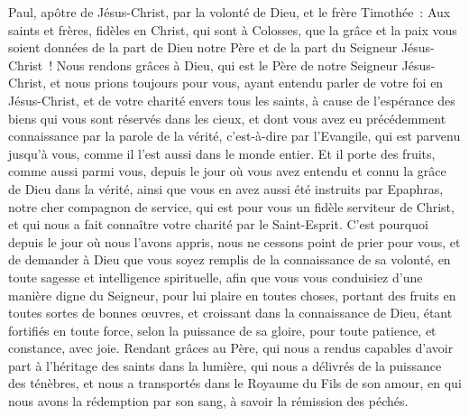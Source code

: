 \begin{multicols}{2}
\VerseOne{}Paul, apôtre de Jésus-Christ, par la volonté de Dieu, et le frère Timothée~:
Aux saints et frères, fidèles en Christ, qui sont à Colosses, que la grâce et la paix vous soient données de la part de Dieu notre Père et de la part du Seigneur Jésus-Christ~!
Nous rendons grâces à Dieu, qui est le Père de notre Seigneur Jésus-Christ, et nous prions toujours pour vous,
ayant entendu parler de votre foi en Jésus-Christ, et de votre charité envers tous les saints,
à cause de l'espérance des biens qui vous sont réservés dans les cieux, et dont vous avez eu précédemment connaissance par la parole de la vérité, c'est-à-dire par l'Evangile,
qui est parvenu jusqu'à vous, comme il l'est aussi dans le monde entier. Et il porte des fruits, comme aussi parmi vous, depuis le jour où vous avez entendu et connu la grâce de Dieu dans la vérité,
ainsi que vous en avez aussi été instruits par Epaphras, notre cher compagnon de service, qui est pour vous un fidèle serviteur de Christ,
et qui nous a fait connaître votre charité par le Saint-Esprit.
C'est pourquoi depuis le jour où nous l'avons appris, nous ne cessons point de prier pour vous, et de demander à Dieu que vous soyez remplis de la connaissance de sa volonté, en toute sagesse et intelligence spirituelle,
afin que vous vous conduisiez d'une manière digne du Seigneur, pour lui plaire en toutes choses, portant des fruits en toutes sortes de bonnes œuvres, et croissant dans la connaissance de Dieu,
étant fortifiés en toute force, selon la puissance de sa gloire, pour toute patience, et constance, avec joie.
Rendant grâces au Père, qui nous a rendus capables d'avoir part à l'héritage des saints dans la lumière,
qui nous a délivrés de la puissance des ténèbres, et nous a transportés dans le Royaume du Fils de son amour,
en qui nous avons la rédemption par son sang, à savoir la rémission des péchés.

\end{multicols}
